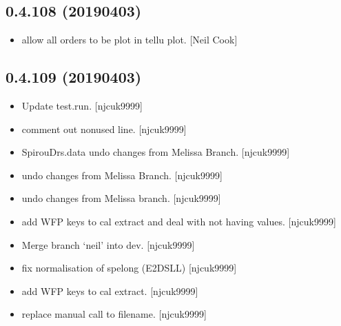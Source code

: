 \documentclass[a4paper,10pt,english]{report}
\begin{document}
\subsection{0.4.108 (2019\sphinxhyphen{}04\sphinxhyphen{}03)}
\label{\detokenize{misc/changelog:id170}}\begin{itemize}
\item {} 
 \sphinxhyphen{} allow all orders to be plot in tellu plot. {[}Neil Cook{]}

\end{itemize}


\subsection{0.4.109 (2019\sphinxhyphen{}04\sphinxhyphen{}03)}
\label{\detokenize{misc/changelog:id171}}\begin{itemize}
\item {} 
Update test.run. {[}njcuk9999{]}

\item {} 
 \sphinxhyphen{} comment out non\sphinxhyphen{}used line. {[}njcuk9999{]}

\item {} 
SpirouDrs.data \sphinxhyphen{} undo changes from Melissa Branch. {[}njcuk9999{]}

\item {} 
 \sphinxhyphen{} undo changes from Melissa Branch. {[}njcuk9999{]}

\item {} 
 \sphinxhyphen{} undo changes from Melissa branch.
{[}njcuk9999{]}

\item {} 
 \sphinxhyphen{} add WFP keys to cal extract and deal with
not having values. {[}njcuk9999{]}

\item {} 
Merge branch ‘neil’ into dev. {[}njcuk9999{]}

\item {} 
 \sphinxhyphen{} fix normalisation of spelong (E2DSLL) {[}njcuk9999{]}

\item {} 
 \sphinxhyphen{} add WFP keys to cal extract. {[}njcuk9999{]}

\item {} 
 \sphinxhyphen{} replace manual call to filename.
{[}njcuk9999{]}

\end{itemize}
\end{document}
